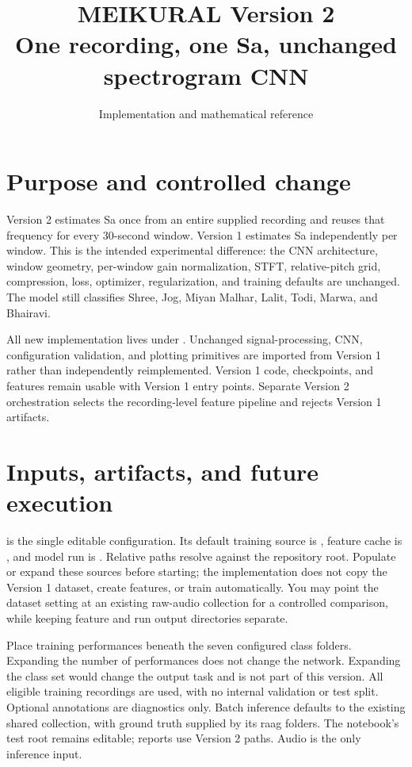\documentclass[11pt,a4paper]{article}
\title{MEIKURAL Version 2\\One recording, one Sa, unchanged spectrogram CNN}
\author{Implementation and mathematical reference}
\date{}
\begin{document}
\maketitle
\tableofcontents

\section{Purpose and controlled change}
Version 2 estimates Sa once from an entire supplied recording and reuses that
frequency for every 30-second window. Version 1 estimates Sa independently per
window. This is the intended experimental difference: the CNN architecture,
window geometry, per-window gain normalization, STFT, relative-pitch grid,
compression, loss, optimizer, regularization, and training defaults are unchanged.
The model still classifies Shree, Jog, Miyan Malhar, Lalit, Todi, Marwa, and Bhairavi.

All new implementation lives under . Unchanged signal-processing,
CNN, configuration validation, and plotting primitives are imported from Version 1
rather than independently reimplemented. Version 1 code, checkpoints, and features
remain usable with Version 1 entry points. Separate Version 2 orchestration selects
the recording-level feature pipeline and rejects Version 1 artifacts.

\section{Inputs, artifacts, and future execution}
 is the single editable configuration. Its default
training source is , feature cache is ,
and model run is . Relative paths resolve against the repository
root. Populate or expand these sources before starting; the implementation does
not copy the Version 1 dataset, create features, or train automatically. You may
point the dataset setting at an existing raw-audio collection for a controlled
comparison, while keeping feature and run output directories separate.

Place training performances beneath the seven configured class folders. Expanding
the number of performances does not change the network. Expanding the class set
would change the output task and is not part of this version. All eligible training
recordings are used, with no internal validation or test split. Optional annotations
are diagnostics only. Batch inference defaults to the existing shared
 collection, with ground truth supplied by its raag
folders. The notebook's test root remains editable; reports use Version 2 paths.
Audio is the only inference input.
\end{document}
